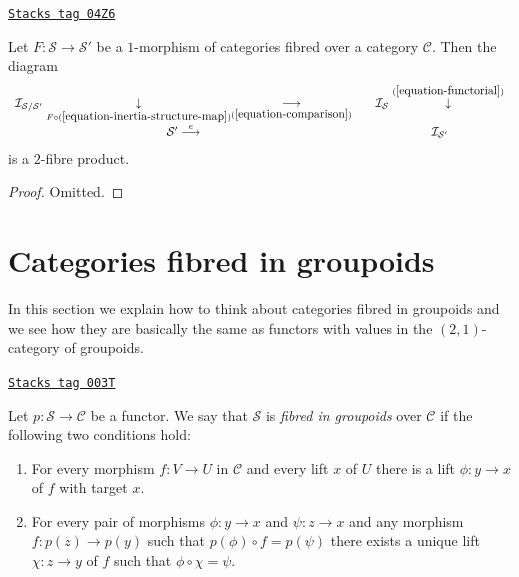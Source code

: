 \begin{lemma}
\label{categories-lemma-relative-inertia-as-fibre-product}
\href{https://stacks.math.columbia.edu/tag/04Z6}{\texttt{Stacks tag 04Z6}}

Let $F : \mathcal{S} \to \mathcal{S}'$ be a $1$-morphism of categories
fibred over a category $\mathcal{C}$. Then the diagram
$$
\begin{array}{ccc}\mathcal{I}_{\mathcal{S}/\mathcal{S}'}
\underset{F \circ (\ref{equation-inertia-structure-map})}{\downarrow}\underset{(\ref{equation-comparison})}{\longrightarrow} &  & \mathcal{I}_\mathcal{S} \overset{(\ref{equation-functorial})}{\downarrow} \\ \mathcal{S}' \overset{e}{\longrightarrow} &  & \mathcal{I}_{\mathcal{S}'}\end{array}
$$
is a $2$-fibre product.
\end{lemma}

\begin{proof}
Omitted.
\end{proof}

\section{Categories fibred in groupoids}
\label{categories-section-fibred-groupoids}
In this section we explain how to think about categories fibred in groupoids
and we see how they are basically the same as functors with
values in the $(2, 1)$-category of groupoids.

\begin{definition}
\label{categories-definition-fibred-groupoids}
\href{https://stacks.math.columbia.edu/tag/003T}{\texttt{Stacks tag 003T}}

Let $p : \mathcal{S} \to \mathcal{C}$ be a functor.
We say that $\mathcal{S}$ is {\it fibred in groupoids} over $\mathcal{C}$ if
the following two conditions hold:
\begin{enumerate}
\item For every morphism $f : V \to U$ in $\mathcal{C}$ and every
lift $x$ of $U$ there is a lift $\phi : y \to x$ of $f$ with
target $x$.
\item For every pair of morphisms $\phi : y \to x$ and $ \psi : z \to x$
and any morphism $f : p(z) \to p(y)$ such that $p(\phi) \circ f = p(\psi)$
there exists a unique lift $\chi : z \to y$ of $f$ such that
$\phi \circ \chi = \psi$.
\end{enumerate}
\end{definition}

